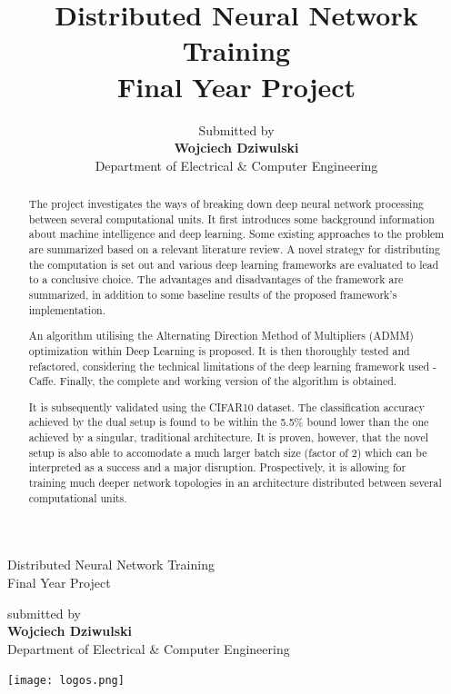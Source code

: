 \documentclass[a4paper, 12pt]{article}
\title{Distributed Neural Network Training \\ \large Final Year Project}
\author{Submitted by \\ \textbf{Wojciech Dziwulski} \\ Department of Electrical \& Computer Engineering}
\date{}
\numberwithin{equation}{section}
\begin{document}
	
	\clearpage

	
	\begin{titlepage}
		\centering
		\vfill
		{\Huge Distributed Neural Network Training}\\
		Final Year Project

		\vskip5cm
			
		submitted by\\
		{\large\textbf{Wojciech Dziwulski}}\\
		Department of Electrical \& Computer Engineering
		
		\vfill
		\texttt{[image: logos.png]} 
		\vfill
		\vfill
	\end{titlepage}
	
	
	\thispagestyle{empty}
	
	\newpage
	
	\begin{abstract}
		The project investigates the ways of breaking down deep neural network processing between several computational units. It first introduces some background information about machine intelligence and deep learning. Some existing approaches to the problem are summarized based on a relevant literature review. A novel strategy for distributing the computation is set out and various deep learning frameworks are evaluated to lead to a conclusive choice. The advantages and disadvantages of the framework are summarized, in addition to some baseline results of the proposed framework's implementation.
		
		An algorithm utilising the Alternating Direction Method of Multipliers (ADMM) optimization within Deep Learning is proposed. It is then thoroughly tested and refactored, considering the technical limitations of the deep learning framework used - Caffe. Finally, the complete and working version of the algorithm is obtained.
		
		It is subsequently validated using the CIFAR10 dataset. The classification accuracy achieved by the dual setup is found to be within the 5.5\% bound lower than the one achieved by a singular, traditional architecture. It is proven, however, that the novel setup is also able to accomodate a much larger batch size (factor of 2) which can be interpreted as a success and a major disruption. Prospectively, it is allowing for training much deeper network topologies in an architecture distributed between several computational units.
		
	\end{abstract}
\end{document}
